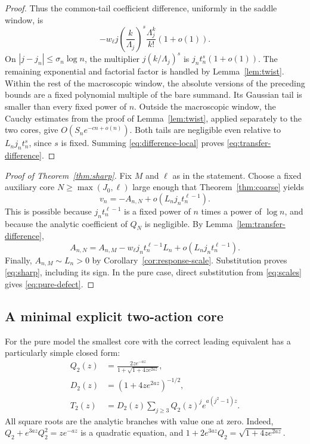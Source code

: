 \documentclass[11pt,a4paper]{article}
\numberwithin{equation}{section}
\theoremstyle{definition}
\theoremstyle{remark}
\begin{document}
\begin{proof}
Thus the common-tail coefficient difference, uniformly in the saddle
window, is
\begin{equation}
 -w_\ell j\left(\frac{k}{\Lambda_j}\right)^s
             \frac{\Lambda_j^k}{k!}(1+o(1)).
 \label{eq:difference-local}
\end{equation}
On $|j-j_n|\le\sigma_n\log n$, the multiplier
$j(k/\Lambda_j)^s$ is $j_nt_n^s(1+o(1))$.
The remaining exponential and factorial factor is handled by
Lemma~\ref{lem:twist}. Within the rest of the macroscopic window,
the absolute versions of the preceding bounds are a fixed polynomial
multiple of the bare summand. Its Gaussian tail is smaller than every
fixed power of $n$. Outside the macroscopic window, the Cauchy estimates
from the proof of Lemma~\ref{lem:twist}, applied separately to the two
cores, give $O(S_ne^{-cn+o(n)})$. Both tails are negligible even relative
to $L_nj_nt_n^s$, since $s$ is fixed. Summing
\eqref{eq:difference-local} proves \eqref{eq:transfer-difference}.
\end{proof}

\begin{proof}[Proof of Theorem~\ref{thm:sharp}]
Fix $M$ and $\ell$ as in the statement. Choose a fixed auxiliary core
$N\ge\max(J_0,\ell)$ large enough that Theorem~\ref{thm:coarse} yields
\[
 v_n=-A_{n,N}+o(L_nj_nt_n^{\ell-1}).
\]
This is possible because $j_nt_n^{\ell-1}$ is a fixed power of $n$
times a power of $\log n$, and because the analytic coefficient of $Q_N$
is negligible. By Lemma~\ref{lem:transfer-difference},
\[
 A_{n,N}=A_{n,M}-w_\ell j_nt_n^{\ell-1}L_n
                       +o(L_nj_nt_n^{\ell-1}).
\]
Finally, $A_{n,M}\sim L_n>0$ by
Corollary~\ref{cor:response-scale}. Substitution proves
\eqref{eq:sharp}, including its sign. In the pure case, direct substitution
from \eqref{eq:scales} gives \eqref{eq:pure-defect}.
\end{proof}

\subsection{A minimal explicit two-action core}

For the pure model the smallest core with the correct leading equivalent
has a particularly simple closed form:
\begin{align}
 Q_2(z)&=\frac{2z e^{-az}}{1+\sqrt{1+4z e^{2az}}},\label{eq:Q2}\\
 D_2(z)&=(1+4z e^{2az})^{-1/2},\label{eq:D2}\\
 T_2(z)&=D_2(z)\sum_{j\ge3}Q_2(z)^j e^{a(j^2-1)z}.
 \label{eq:T2}
\end{align}
All square roots are the analytic branches with value one at zero.
Indeed, $Q_2+e^{3az}Q_2^2=z e^{-az}$ is a quadratic equation, and
$1+2e^{3az}Q_2=\sqrt{1+4ze^{2az}}$.
\end{document}
